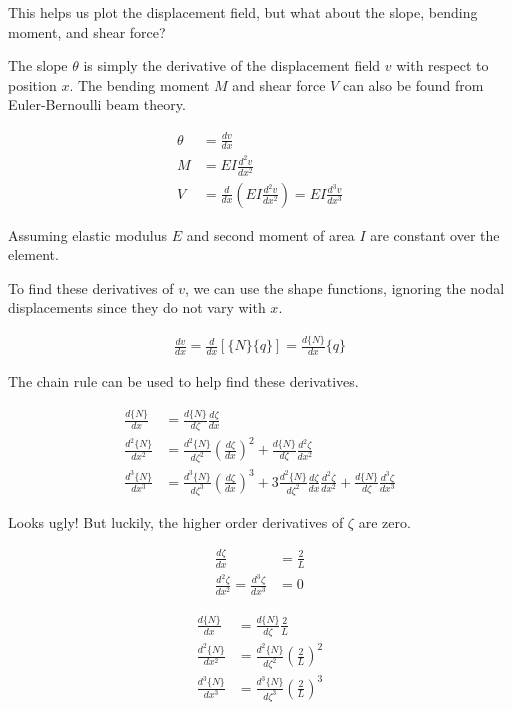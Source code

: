 \documentclass[10pt,letterpaper]{article}
\begin{document}
	This helps us plot the displacement field, but what about the slope, bending moment, and shear force?

	The slope $\theta$ is simply the derivative of the displacement field $v$ with respect to position $x$. The bending moment $M$ and shear force $V$ can also be found from Euler-Bernoulli beam theory.

	\begin{align}
		\theta &= \frac{d v}{d x} \\
		M      &= E I \frac{d^2 v}{d x^2} \\
		V      &= \frac{d}{d x} (E I \frac{d^2 v}{d x^2}) = E I \frac{d^3 v}{d x^3}
	\end{align}

	Assuming elastic modulus $E$ and second moment of area $I$ are constant over the element.

	To find these derivatives of $v$, we can use the shape functions, ignoring the nodal displacements since they do not vary with $x$.

	\begin{align}
		\frac{dv}{dx} = \frac{d}{dx} [\{N\} \{q\}] = \frac{d \{N\}}{dx} \{q\}
	\end{align}

	The chain rule can be used to help find these derivatives.

	\begin{align}
		\frac{d \{N\}}{d x} &= \frac{d \{N\}}{d \zeta} \frac{d \zeta}{d x} \\
		\frac{d^2 \{N\}}{d x^2} &= \frac{d^2 \{N\}}{d \zeta^2} (\frac{d \zeta}{d x})^2 + \frac{d \{N\}}{d \zeta} \frac{d^2 \zeta}{d x^2} \\
		\frac{d^3 \{N\}}{d x^3} &= \frac{d^3 \{N\}}{d \zeta^3} (\frac{d \zeta}{d x})^3 + 3 \frac{d^2 \{N\}}{d \zeta^2} \frac{d \zeta}{d x}\frac{d^2 \zeta}{d x^2} + \frac{d \{N\}}{d \zeta}\frac{d^3 \zeta}{d x^3}
	\end{align}

	Looks ugly! But luckily, the higher order derivatives of $\zeta$ are zero.

	\begin{align}
		\frac{d \zeta}{d x} &= \frac{2}{L} \\
		\frac{d^2 \zeta}{d x^2} = \frac{d^3 \zeta}{d x^3} &= 0
	\end{align}

	\begin{align}
		\frac{d \{N\}}{d x} &= \frac{d \{N\}}{d \zeta} \frac{2}{L} \\
		\frac{d^2 \{N\}}{d x^2} &= \frac{d^2 \{N\}}{d \zeta^2} (\frac{2}{L})^2 \\
		\frac{d^3 \{N\}}{d x^3} &= \frac{d^3 \{N\}}{d \zeta^3} (\frac{2}{L})^3
	\end{align}
\end{document}
